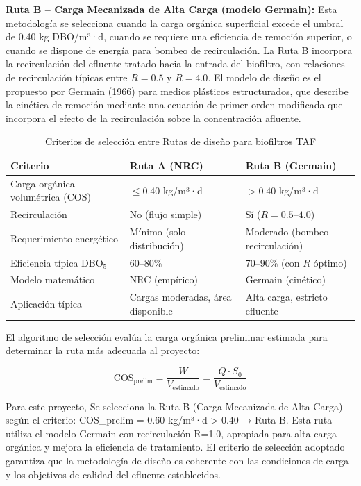 \documentclass[12pt,a4paper]{article}
\begin{document}
\textbf{Ruta B -- Carga Mecanizada de Alta Carga (modelo Germain):} Esta metodología se selecciona cuando la carga orgánica superficial excede el umbral de 0.40 kg DBO/m³·d, cuando se requiere una eficiencia de remoción superior, o cuando se dispone de energía para bombeo de recirculación. La Ruta B incorpora la recirculación del efluente tratado hacia la entrada del biofiltro, con relaciones de recirculación típicas entre $R = 0.5$ y $R = 4.0$. El modelo de diseño es el propuesto por Germain (1966) para medios plásticos estructurados, que describe la cinética de remoción mediante una ecuación de primer orden modificada que incorpora el efecto de la recirculación sobre la concentración afluente.

\begin{table}[H]
\centering
\caption{Criterios de selección entre Rutas de diseño para biofiltros TAF}
\label{tab:seleccion_ruta_taf}
\begin{tabular}{p{4.5cm}p{5cm}p{5cm}}
\toprule
\textbf{Criterio} & \textbf{Ruta A (NRC)} & \textbf{Ruta B (Germain)} \\
\midrule
Carga orgánica volumétrica (COS) & $\leq 0.40$ kg/m³·d & $> 0.40$ kg/m³·d \\
Recirculación & No (flujo simple) & Sí ($R = 0.5$--$4.0$) \\
Requerimiento energético & Mínimo (solo distribución) & Moderado (bombeo recirculación) \\
Eficiencia típica DBO$_5$ & 60--80\% & 70--90\% (con $R$ óptimo) \\
Modelo matemático & NRC (empírico) & Germain (cinético) \\
Aplicación típica & Cargas moderadas, área disponible & Alta carga, estricto efluente \\
\bottomrule
\end{tabular}
\end{table}

El algoritmo de selección evalúa la carga orgánica preliminar estimada para determinar la ruta más adecuada al proyecto:

\begin{equation}
\text{COS}_{\text{prelim}} = \frac{W}{V_{\text{estimado}}} = \frac{Q \cdot S_0}{V_{\text{estimado}}}
\end{equation}

Para este proyecto, Se selecciona la Ruta B (Carga Mecanizada de Alta Carga) según el criterio: COS_prelim = 0.60 kg/m³·d > 0.40 → Ruta B. Esta ruta utiliza el modelo Germain con recirculación R=1.0, apropiada para alta carga orgánica y mejora la eficiencia de tratamiento. El criterio de selección adoptado garantiza que la metodología de diseño es coherente con las condiciones de carga y los objetivos de calidad del efluente establecidos.
\end{document}
